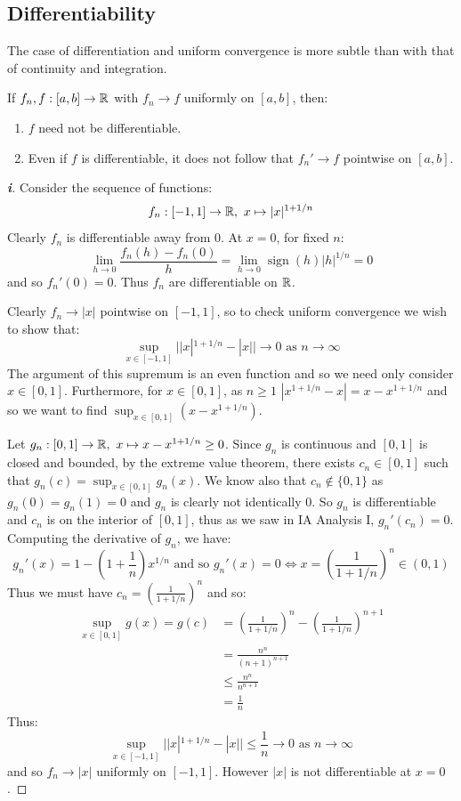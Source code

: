 \documentclass[../main.tex]{subfiles}
\begin{document}
\subsection{Differentiability}
The case of differentiation and uniform convergence is more subtle than with that of continuity and integration.
\begin{proposition}
  If $f_n, f: [a, b] \to \mathbb{R}$ with $f_n \to f$ uniformly on $[a, b]$, then:
  \begin{enumerate}
    \item $f$ need not be differentiable.
    \item Even if $f$ is differentiable, it does not follow that $f_n' \to f$ pointwise on $[a, b]$.
  \end{enumerate}
\end{proposition}
\begin{proof}[\textbf{i}]
  Consider the sequence of functions:
  \[
    f_n: [-1, 1] \to \mathbb{R},\ x \mapsto |x|^{1 + 1/n}
  \]
  Clearly $f_n$ is differentiable away from 0.
  At $x = 0$, for fixed $n$:
  \[
    \lim_{h \to 0} \frac{f_n(h) - f_n(0)}{h} = \lim_{h \to 0} \operatorname{sign}(h) |h|^{1/n} = 0
  \]
  and so $f_{n}'(0) = 0$.
  Thus $f_n$ are differentiable on $\mathbb{R}$.

  Clearly $f_n \to |x|$ pointwise on $[-1, 1]$, so to check uniform convergence we wish to show that:
  \[
    \sup_{x \in [-1, 1]} ||x|^{1 + 1/n} - |x|| \to 0 \text{ as } n \to \infty
  \]
  The argument of this supremum is an even function and so we need only consider $x \in [0, 1]$.
  Furthermore, for $x \in [0, 1]$, as $n \geq 1$ $|x^{1 + 1/n} - x| = x - x^{1 + 1/n}$ and so we want to find $\sup_{x \in [0, 1]} (x - x^{1 + 1/n})$.

  Let $g_n: [0, 1] \to \mathbb{R},\ x \mapsto x - x^{1 + 1/n} \geq 0$.
  Since $g_n$ is continuous and $[0, 1]$ is closed and bounded, by the extreme value theorem, there exists $c_n \in [0, 1]$ such that $g_n(c) = \sup_{x \in [0, 1]} g_n(x)$.
  We know also that $c_n \notin \{0, 1\}$ as $g_n(0) = g_n(1) = 0$ and $g_n$ is clearly not identically 0.
  So $g_n$ is differentiable and $c_n$ is on the interior of $[0, 1]$, thus as we saw in IA Analysis I, $g_n'(c_n) = 0$.
  Computing the derivative of $g_n$, we have:
  \[
    g_n'(x) = 1 - \left(1 + \frac{1}{n}\right)x^{1/n} \text{ and so } g_n'(x) = 0 \iff x = \left(\frac{1}{1 + 1/n}\right)^n \in (0, 1)
  \]
  Thus we must have $c_n = (\frac{1}{1 + 1/n})^n$ and so:
  \begin{align*}
    \sup_{x \in [0, 1]} g(x) = g(c) &= \left(\frac{1}{1 + 1/n}\right)^{n} - \left(\frac{1}{1 + 1/n}\right)^{n + 1} \\
                                    &= \frac{n^n}{(n + 1)^{n + 1}} \\
                                    &\leq \frac{n^n}{n^{n + 1}} \\
                                    &= \frac{1}{n}
  \end{align*}
  Thus:
  \[
    \sup_{x \in [-1, 1]} ||x|^{1 + 1/n} - |x|| \leq \frac{1}{n} \to 0 \text{ as } n \to \infty
  \]
  and so $f_n \to |x|$ uniformly on $[-1, 1]$.
  However $|x|$ is not differentiable at $x = 0$.
\end{proof}
\end{document}
